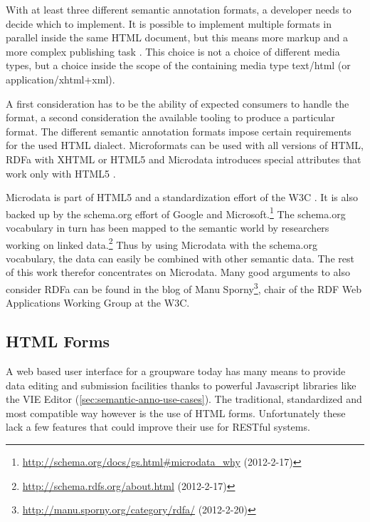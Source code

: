 \documentclass[11pt,a4paper,headsepline,twoside]{scrartcl}		%
\newcommand{\citeurl}[2]{\url{#1} (#2)}
\begin{document}
With at least three different semantic annotation formats, a developer needs to
decide which to implement. It is possible to implement multiple formats in
parallel inside the same HTML document, but this means more markup and a more
complex publishing task \cite{Tennison2012}. This choice is not a choice of
different media types, but a choice inside the scope of the containing media type
text/html (or application/xhtml+xml).

A first consideration has to be the ability of expected consumers to handle the
format, a second consideration the available tooling to produce a particular
format. The different semantic annotation formats impose certain requirements
for the used HTML dialect. Microformats can be used with all versions of HTML,
RDFa with XHTML or HTML5 and Microdata introduces special attributes that work
only with HTML5 \cite{Tennison2012}.

Microdata is part of HTML5 and a standardization effort of the W3C
\cite{Hickson2011}.  It is also backed up by the schema.org effort of Google and
Microsoft.\footnote{\citeurl{http://schema.org/docs/gs.html\#microdata_why}{2012-2-17}}
The schema.org vocabulary in turn has been mapped to the semantic world by
researchers working on linked
data.\footnote{\citeurl{http://schema.rdfs.org/about.html}{2012-2-17}} Thus by
using Microdata with the schema.org vocabulary, the data can easily be combined
with other semantic data. The rest of this work therefor concentrates on
Microdata. Many good arguments to also consider RDFa can be found in the blog of
Manu
Sporny\footnote{\citeurl{http://manu.sporny.org/category/rdfa/}{2012-2-20}},
chair of the RDF Web Applications Working Group at the W3C.


\subsection{HTML Forms}
\label{sec:html-forms}


A web based user interface for a groupware today has many means to provide data
editing and submission facilities thanks to powerful Javascript libraries like
the VIE Editor (\autoref{sec:semantic-anno-use-cases}). The traditional,
standardized and most compatible way however is the use of HTML
forms. Unfortunately these lack a few features that could improve their use for
RESTful systems.
\end{document}
